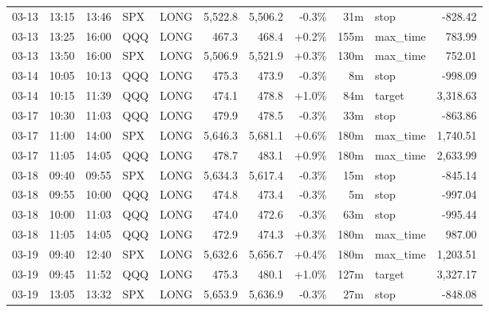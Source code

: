 \documentclass[11pt,a4paper,twoside]{article}
\begin{document}
\begin{center}
\begin{longtable}{>{\color{txtmain}}l l l l l r r r r >{\color{txtmain}}l r}
03-13 & 13:15 & 13:46 & SPX & LONG & 5,522.8 & 5,506.2 & \textcolor{lossred}{-0.3\%} & 31m & stop & \textcolor{lossred}{-828.42} \\
03-13 & 13:25 & 16:00 & QQQ & LONG & 467.3 & 468.4 & \textcolor{wingreen}{+0.2\%} & 155m & max\_time & \textcolor{wingreen}{783.99} \\
03-13 & 13:50 & 16:00 & SPX & LONG & 5,506.9 & 5,521.9 & \textcolor{wingreen}{+0.3\%} & 130m & max\_time & \textcolor{wingreen}{752.01} \\
03-14 & 10:05 & 10:13 & QQQ & LONG & 475.3 & 473.9 & \textcolor{lossred}{-0.3\%} & 8m & stop & \textcolor{lossred}{-998.09} \\
03-14 & 10:15 & 11:39 & QQQ & LONG & 474.1 & 478.8 & \textcolor{wingreen}{+1.0\%} & 84m & target & \textcolor{wingreen}{3,318.63} \\
03-17 & 10:30 & 11:03 & QQQ & LONG & 479.9 & 478.5 & \textcolor{lossred}{-0.3\%} & 33m & stop & \textcolor{lossred}{-863.86} \\
03-17 & 11:00 & 14:00 & SPX & LONG & 5,646.3 & 5,681.1 & \textcolor{wingreen}{+0.6\%} & 180m & max\_time & \textcolor{wingreen}{1,740.51} \\
03-17 & 11:05 & 14:05 & QQQ & LONG & 478.7 & 483.1 & \textcolor{wingreen}{+0.9\%} & 180m & max\_time & \textcolor{wingreen}{2,633.99} \\
03-18 & 09:40 & 09:55 & SPX & LONG & 5,634.3 & 5,617.4 & \textcolor{lossred}{-0.3\%} & 15m & stop & \textcolor{lossred}{-845.14} \\
03-18 & 09:55 & 10:00 & QQQ & LONG & 474.8 & 473.4 & \textcolor{lossred}{-0.3\%} & 5m & stop & \textcolor{lossred}{-997.04} \\
03-18 & 10:00 & 11:03 & QQQ & LONG & 474.0 & 472.6 & \textcolor{lossred}{-0.3\%} & 63m & stop & \textcolor{lossred}{-995.44} \\
03-18 & 11:05 & 14:05 & QQQ & LONG & 472.9 & 474.3 & \textcolor{wingreen}{+0.3\%} & 180m & max\_time & \textcolor{wingreen}{987.00} \\
03-19 & 09:40 & 12:40 & SPX & LONG & 5,632.6 & 5,656.7 & \textcolor{wingreen}{+0.4\%} & 180m & max\_time & \textcolor{wingreen}{1,203.51} \\
03-19 & 09:45 & 11:52 & QQQ & LONG & 475.3 & 480.1 & \textcolor{wingreen}{+1.0\%} & 127m & target & \textcolor{wingreen}{3,327.17} \\
03-19 & 13:05 & 13:32 & SPX & LONG & 5,653.9 & 5,636.9 & \textcolor{lossred}{-0.3\%} & 27m & stop & \textcolor{lossred}{-848.08} \\

\end{longtable}
\end{center}
\end{document}
